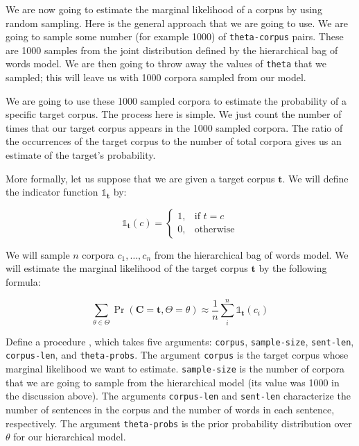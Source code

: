 \documentclass[10pt]{article}
\newcommand{\required}[1]{{\color{blue}{#1}}}
\begin{document}
 We are now going to estimate the marginal likelihood of a
corpus by using random sampling. Here is the general approach that we
are going to use. We are going to sample some number (for example
1000) of \texttt{theta-corpus} pairs. These are 1000 samples from the
joint distribution defined by the hierarchical bag of words model. We
are then going to throw away the values of \texttt{theta} that we
sampled; this will leave us with 1000 corpora sampled from our model.

We are going to use these 1000 sampled corpora to estimate
the probability of a specific target corpus. The process here is
simple. We just count the number of times that our target corpus
appears in the 1000 sampled corpora. The ratio of the occurrences of
the target corpus to the number of total corpora gives us an estimate
of the target's probability.

More formally, let us suppose that we are given a target
corpus $\mathbf{t}$. We will define the indicator function
$\mathds{1}_{\mathbf{t}}$ by:

\begin{equation}
\mathds{1}_{\mathbf{t}}(c) =
\begin{cases}
    1, & \text{if } t = c\\
    0, & \text{otherwise}
\end{cases}
\end{equation}

 We will sample $n$ corpora $c_1,\ldots,c_n$ from the
hierarchical bag of words model. We will estimate the marginal
likelihood of the target corpus $\mathbf{t}$ by the following formula:

\begin{equation}
\label{eq:montecarlo-marginal}
\sum_{\theta \in \Theta} \Pr(\mathbf{C}=\mathbf{t}, \Theta=\theta)  \approx \frac{1}{n} \sum_{i}^{n}\mathds{1}_{\mathbf{t}}(c_i) 
\end{equation}

 Define a procedure
\required{\texttt{estimate-corpus-marginal}}, which takes five
arguments: \texttt{corpus}, \texttt{sample-size}, \texttt{sent-len},
\texttt{corpus-len}, and \texttt{theta-probs}. The argument
\texttt{corpus} is the target corpus whose marginal likelihood we want
to estimate. \texttt{sample-size} is the number of corpora that we are
going to sample from the hierarchical model (its value was 1000 in the
discussion above). The arguments \texttt{corpus-len} and
\texttt{sent-len} characterize the number of sentences in the corpus
and the number of words in each sentence, respectively. The argument
\texttt{theta-probs} is the prior probability distribution over
$\theta$ for our hierarchical model.
\end{document}
